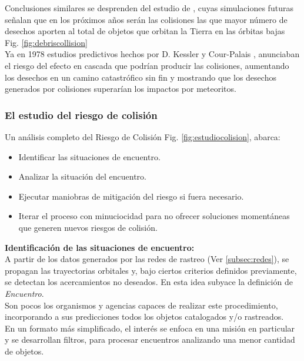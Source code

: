 Conclusiones similares se desprenden del estudio de \citep{karacalioglu2016impact}, cuyas simulaciones futuras se\~nalan que en los pr\'oximos a\~nos ser\'an las colisiones las que mayor n\'umero de desechos aporten al total de objetos que orbitan la Tierra en las \'orbitas bajas Fig. \ref{fig:debriscollision}\\


Ya en 1978  estudios predictivos hechos por D. Kessler y Cour-Palais
 \cite{kessler0}, anunciaban el riesgo del efecto en cascada que podr\'ian producir las colisiones, aumentando los desechos en un camino catastr\'ofico sin fin y mostrando que los desechos generados por colisiones superar\'ian los impactos por meteoritos.\\

 \subsubsection*{El estudio del riesgo de colisi\'on}

Un an\'alisis completo del Riesgo de Colisi\'on Fig. \ref{fig:estudiocolision}, abarca:

\begin{itemize}
\setlength{\itemsep}{0pt}
\item Identificar las situaciones de encuentro.
\item Analizar la situaci\'on del encuentro.
\item Ejecutar maniobras de mitigaci\'on del riesgo si fuera necesario.
\item Iterar el proceso con minuciocidad para no ofrecer soluciones moment\'aneas que generen nuevos riesgos de colisi\'on.
\end{itemize}

{\bf{Identificaci\'on de las situaciones de encuentro:}}\\
A partir de los datos generados por las redes de rastreo (Ver \ref{subsec:redes}), se propagan las trayectorias orbitales y, bajo ciertos criterios definidos previamente, se detectan los acercamientos no deseados. En esta idea subyace la definici\'on de {\it{Encuentro}}.\\
Son pocos los organismos y agencias capaces de realizar este procedimiento, incorporando a sus predicciones todos los objetos catalogados y/o rastreados.\\
En un formato m\'as simplificado, el inter\'es se enfoca en una misi\'on en particular y se desarrollan filtros, para procesar encuentros analizando una menor cantidad de objetos.\\


